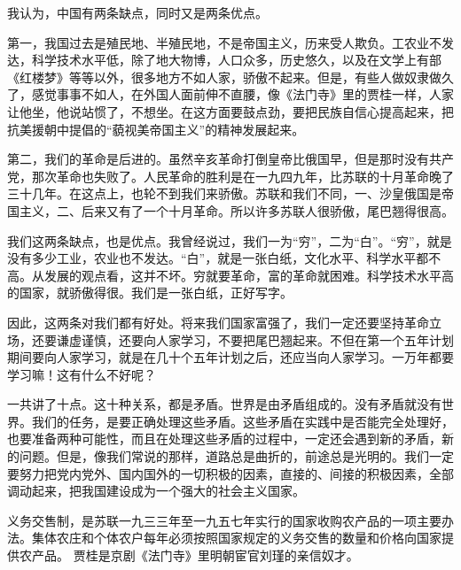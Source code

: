 我认为，中国有两条缺点，同时又是两条优点。

第一，我国过去是殖民地、半殖民地，不是帝国主义，历来受人欺负。工农业不发达，科学技术水平低，除了地大物博，人口众多，历史悠久，以及在文学上有部《红楼梦》等等以外，很多地方不如人家，骄傲不起来。但是，有些人做奴隶做久了，感觉事事不如人，在外国人面前伸不直腰，像《法门寺》里的贾桂一样，人家让他坐，他说站惯了，不想坐。在这方面要鼓点劲，要把民族自信心提高起来，把抗美援朝中提倡的“藐视美帝国主义”的精神发展起来。

第二，我们的革命是后进的。虽然辛亥革命打倒皇帝比俄国早，但是那时没有共产党，那次革命也失败了。人民革命的胜利是在一九四九年，比苏联的十月革命晚了三十几年。在这点上，也轮不到我们来骄傲。苏联和我们不同，一、沙皇俄国是帝国主义，二、后来又有了一个十月革命。所以许多苏联人很骄傲，尾巴翘得很高。

我们这两条缺点，也是优点。我曾经说过，我们一为“穷”，二为“白”。“穷”，就是没有多少工业，农业也不发达。“白”，就是一张白纸，文化水平、科学水平都不高。从发展的观点看，这并不坏。穷就要革命，富的革命就困难。科学技术水平高的国家，就骄傲得很。我们是一张白纸，正好写字。

因此，这两条对我们都有好处。将来我们国家富强了，我们一定还要坚持革命立场，还要谦虚谨慎，还要向人家学习，不要把尾巴翘起来。不但在第一个五年计划期间要向人家学习，就是在几十个五年计划之后，还应当向人家学习。一万年都要学习嘛！这有什么不好呢？

一共讲了十点。这十种关系，都是矛盾。世界是由矛盾组成的。没有矛盾就没有世界。我们的任务，是要正确处理这些矛盾。这些矛盾在实践中是否能完全处理好，也要准备两种可能性，而且在处理这些矛盾的过程中，一定还会遇到新的矛盾，新的问题。但是，像我们常说的那样，道路总是曲折的，前途总是光明的。我们一定要努力把党内党外、国内国外的一切积极的因素，直接的、间接的积极因素，全部调动起来，把我国建设成为一个强大的社会主义国家。


\begin{maonote}
义务交售制，是苏联一九三三年至一九五七年实行的国家收购农产品的一项主要办法。集体农庄和个体农户每年必须按照国家规定的义务交售的数量和价格向国家提供农产品。
贾桂是京剧《法门寺》里明朝宦官刘瑾的亲信奴才。
\end{maonote}
